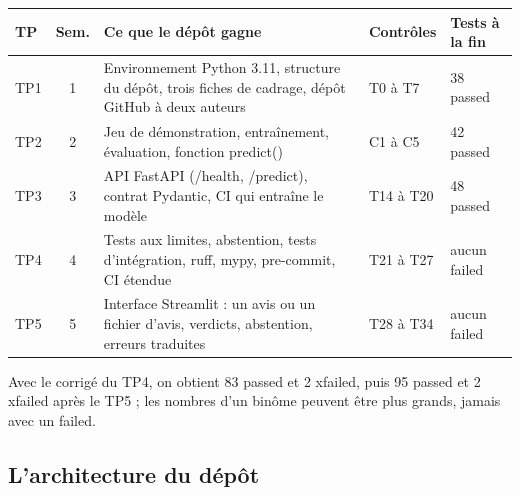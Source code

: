 \documentclass[11pt,a4paper]{article}
\newcommand{\co}[1]{{\ttfamily\hyphenchar\font=45\relax #1}}
\begin{document}
\begin{center}
\begin{tabularx}{\textwidth}{@{}l c X l l@{}}
\toprule
\textbf{TP} & \textbf{Sem.} & \textbf{Ce que le dépôt gagne} & \textbf{Contrôles} & \textbf{Tests à la fin} \\
\midrule
TP1 & 1 & Environnement Python 3.11, structure du dépôt, trois fiches de cadrage, dépôt GitHub à deux auteurs & T0 à T7 & 38 passed \\
TP2 & 2 & Jeu de démonstration, entraînement, évaluation, fonction \co{predict()} & C1 à C5 & 42 passed \\
TP3 & 3 & API FastAPI (\co{/health}, \co{/predict}), contrat Pydantic, CI qui entraîne le modèle & T14 à T20 & 48 passed \\
TP4 & 4 & Tests aux limites, abstention, tests d'intégration, ruff, mypy, pre-commit, CI étendue & T21 à T27 & aucun \co{failed} \\
TP5 & 5 & Interface Streamlit : un avis ou un fichier d'avis, verdicts, abstention, erreurs traduites & T28 à T34 & aucun \co{failed} \\
\bottomrule
\end{tabularx}
\end{center}

Avec le corrigé du TP4, on obtient 83 passed et 2 xfailed, puis 95 passed et 2 xfailed après le TP5 ; les
nombres d'un binôme peuvent être plus grands, jamais avec un \co{failed}.

\subsection{L'architecture du dépôt}
\end{document}
